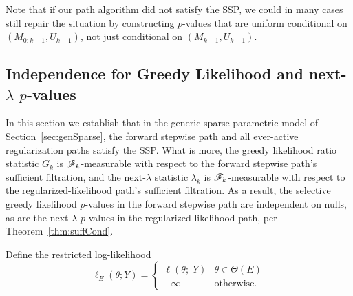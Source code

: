 \documentclass{article}
\begin{document}
Note that if our path algorithm did not satisfy the SSP, we could in many cases still repair the situation by constructing $p$-values that are uniform conditional on $(M_{0:k-1},U_{k-1})$, not just conditional on $(M_{k-1},U_{k-1})$.

\subsection{Independence for Greedy Likelihood and next-$\lambda$ $p$-values}\label{sec:SSP}

In this section we establish that in the generic sparse parametric model of Section~\ref{sec:genSparse}, the forward stepwise path and all ever-active regularization paths satisfy the SSP. What is more, the greedy likelihood ratio statistic $G_k$ is $\mathscr{F}_k$-measurable with respect to the forward stepwise path's sufficient filtration, and the next-$\lambda$ statistic $\lambda_k$ is $\mathscr{F}_k$-measurable with respect to the regularized-likelihood path's sufficient filtration. As a result, the selective greedy likelihood $p$-values in the forward stepwise path are independent on nulls, as are the next-$\lambda$ $p$-values in the regularized-likelihood path, per Theorem~\ref{thm:suffCond}.

Define the restricted log-likelihood
\begin{equation}
\ell_E(\theta; Y) = \left\{\begin{matrix} 
    \ell(\theta; \;Y) & \theta \in \Theta(E)\\ 
    -\infty  & \mathrm{ otherwise.}\end{matrix}\right. 
\end{equation}
\end{document}
